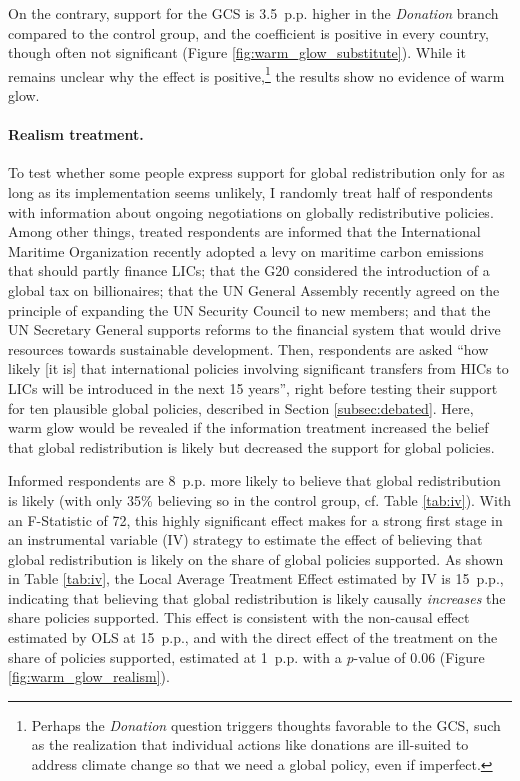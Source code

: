 \documentclass[12pt,english]{article}
\begin{document}
\begin{bibunit}
\begin{figure}[h!]
\begin{subfigure}{.49\textwidth}
\end{subfigure}
\end{figure}

On the contrary, support for the GCS is 3.5~p.p. higher in the \textit{Donation} branch compared to the control group, and the coefficient is positive in every country, though often not significant (Figure \ref{fig:warm_glow_substitute}). While it remains unclear why the effect is positive,\footnote{Perhaps the \textit{Donation} question triggers thoughts favorable to the GCS, such as the realization that individual actions like donations are ill-suited to address climate change so that we need a global policy, even if imperfect.} 
the results show no evidence of warm glow.

\paragraph{Realism treatment.}

To test whether some people express support for global redistribution only for as long as its implementation seems unlikely, I randomly treat half of respondents with information about ongoing negotiations on globally redistributive policies. Among other things, treated respondents are informed that the International Maritime Organization recently adopted a levy on maritime carbon emissions that should partly finance LICs; that the G20 considered the introduction of a global tax on billionaires; that the UN General Assembly recently agreed on the principle of expanding the UN Security Council to new members; and that the UN Secretary General supports reforms to the financial system that would drive resources towards sustainable development. 
Then, respondents are asked ``how likely [it is] that international policies involving significant transfers from HICs to LICs will be introduced in the next 15 years'', right before testing their support for ten plausible global policies, described in Section \ref{subsec:debated}. Here, warm glow would be revealed if the information treatment increased the belief that global redistribution is likely but decreased the support for global policies. %

Informed respondents are 8~p.p. more likely to believe that global redistribution is likely (with only 35\% believing so in the control group, cf. Table \ref{tab:iv}). With an F-Statistic of 72, this highly significant effect makes for a strong first stage in an instrumental variable (IV) strategy to estimate the effect of believing that global redistribution is likely on the share of global policies supported. As shown in Table \ref{tab:iv}, the Local Average Treatment Effect estimated by IV is 15~p.p., indicating that believing that global redistribution is likely causally \textit{increases} the share policies supported. This effect is consistent with the non-causal effect estimated by OLS at 15~p.p., and with the direct effect of the treatment on the share of policies supported, estimated at 1~p.p. with a \textit{p}-value of 0.06 (Figure \ref{fig:warm_glow_realism}). %


\end{bibunit}
\end{document}
